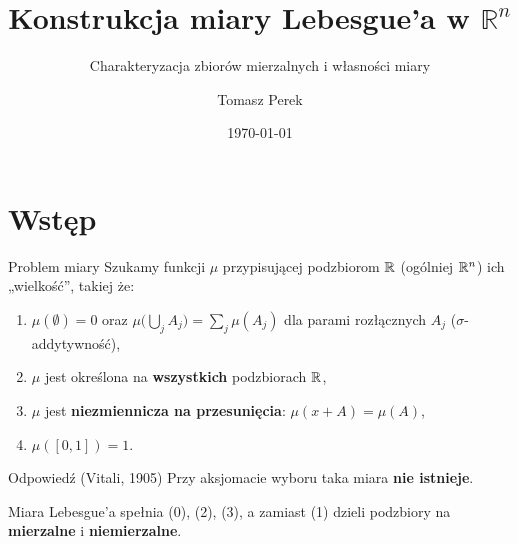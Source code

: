 \documentclass[aspectratio=169,11pt,t,envcountsect,professionalfonts]{beamer}
\title[Miara Lebesgue'a w $\mathbb{R}^n$]{Konstrukcja miary Lebesgue'a w $\mathbb{R}^n$}
\subtitle{Charakteryzacja zbiorów mierzalnych i własności miary}
\author{Tomasz Perek}
\institute{Matematyka zaoczna III rok\\ UKSW}
\date{\today}
\begin{document}
\begin{frame}
  \titlepage
\end{frame}

\section{Wstęp}

\begin{frame}{Problem miary}
  Szukamy funkcji $\mu$ przypisującej podzbiorom $\mathbb{R}$ (ogólniej $\mathbb{R}^{n}$) ich „wielkość”, takiej że:
  \begin{enumerate}
    \item[(0)] $\mu(\emptyset) = 0$ oraz $\mu\big(\bigcup_j A_j\big) = \sum_j \mu(A_j)$ dla parami rozłącznych $A_j$ ($\sigma$-addytywność),
    \item[(1)] $\mu$ jest określona na \textbf{wszystkich} podzbiorach $\mathbb{R}$,
    \item[(2)] $\mu$ jest \textbf{niezmiennicza na przesunięcia}: $\mu(x + A) = \mu(A)$,
    \item[(3)] $\mu([0,1]) = 1$.
  \end{enumerate}

  \medskip
  \begin{block}{Odpowiedź (Vitali, 1905)}
    Przy aksjomacie wyboru taka miara \textbf{nie istnieje}.
  \end{block}

  \medskip
  Miara Lebesgue'a spełnia (0), (2), (3), a zamiast (1) dzieli podzbiory na \textbf{mierzalne} i \textbf{niemierzalne}.
\end{frame}
\end{document}
